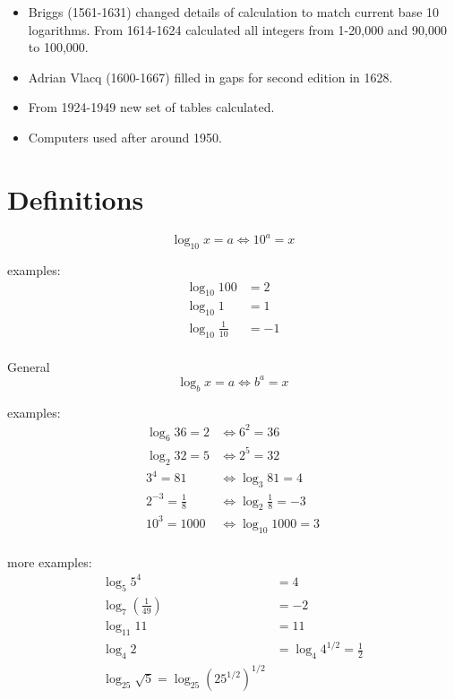 \documentclass{exam}
\begin{document}
  \begin{itemize}
    \item Briggs (1561-1631) changed details of calculation to match current base 10 logarithms.  From 1614-1624
      calculated all integers from 1-20,000 and 90,000 to 100,000.  

    \item Adrian Vlacq (1600-1667) filled in gaps for second edition in 1628.

    \item From 1924-1949 new set of tables calculated.

    \item Computers used after around 1950.
  \end{itemize}

  \pagebreak

  \section{Definitions}

  \[
    \log_{10} x = a \Longleftrightarrow 10^a = x
  \]

  examples:
  \begin{align*}
    \log_{10} 100 &= 2 \\
    \log_{10} 1 &= 1 \\
    \log_{10} \frac{1}{10} &= -1 \\
  \end{align*}

  General
  \[
    \log_b x = a \Longleftrightarrow b^a = x
  \]

  examples:
  \begin{align*}
    \log_6 36 = 2 & \Longleftrightarrow 6^2 = 36 \\
    \log_2 32 = 5 & \Longleftrightarrow 2^5 = 32 \\
    3^4 = 81 & \Longleftrightarrow \log_3 81 = 4 \\
    2^{-3} = \frac{1}{8} & \Longleftrightarrow \log_2 \frac{1}{8} = -3 \\
    10^3 = 1000 & \Longleftrightarrow \log_{10} 1000 = 3 \\
  \end{align*}

  more examples:
  \begin{align*}
    \log_5 5^4 &= 4 \\
    \log_7 \left( \frac{1}{49} \right) &= -2 \\
    \log_{11} 11 &= 11 \\
    \log_4 2 &= \log_4 4^{1/2} = \frac{1}{2} \\
    \log_{25} \sqrt{5} = \log_{25} \left( 25^{1/2} \right)^{1/2} \\
  \end{align*}
\end{document}

